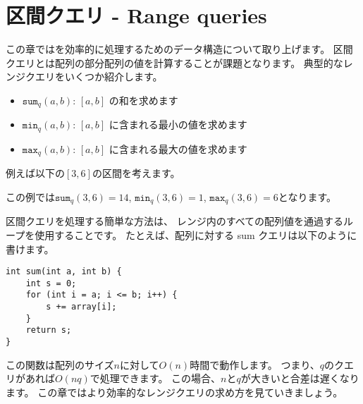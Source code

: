 \chapter{区間クエリ - Range queries}


この章ではを効率的に処理するためのデータ構造について取り上げます。
区間クエリとは配列の部分配列の値を計算することが課題となります。
典型的なレンジクエリをいくつか紹介します。

\begin{itemize}
\item $\texttt{sum}_q(a,b)$: $[a,b]$ の和を求めます
\item $\texttt{min}_q(a,b)$: $[a,b]$ に含まれる最小の値を求めます
\item $\texttt{max}_q(a,b)$: $[a,b]$ に含まれる最大の値を求めます
\end{itemize}

例えば以下の$[3,6]$の区間を考えます。
\begin{center}
\end{center}
この例では$\texttt{sum}_q(3,6)=14$,
$\texttt{min}_q(3,6)=1$, $\texttt{max}_q(3,6)=6$となります。

区間クエリを処理する簡単な方法は、
レンジ内のすべての配列値を通過するループを使用することです。
たとえば、配列に対する sum クエリは以下のように書けます。

\begin{lstlisting}
int sum(int a, int b) {
    int s = 0;
    for (int i = a; i <= b; i++) {
        s += array[i];
    }
    return s;
}
\end{lstlisting}

この関数は配列のサイズ$n$に対して$O(n)$時間で動作します。
つまり、$q$のクエリがあれば$O(nq)$で処理できます。
この場合、$n$と$q$が大きいと合差は遅くなります。
この章ではより効率的なレンジクエリの求め方を見ていきましょう。

